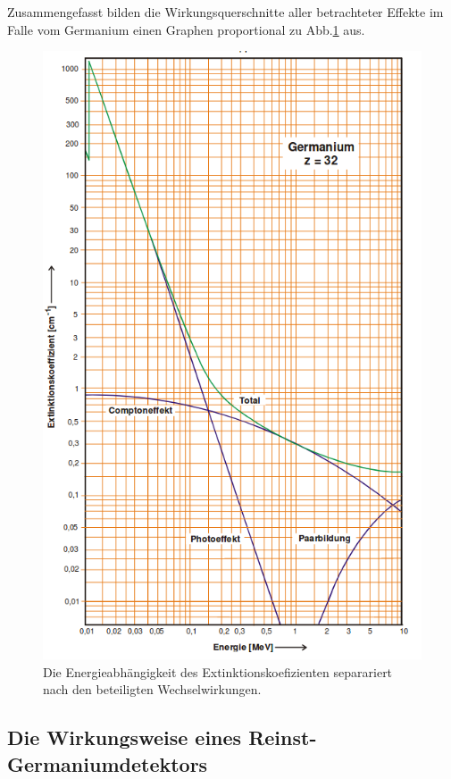 Zusammengefasst bilden die Wirkungsquerschnitte aller betrachteter Effekte im Falle vom Germanium einen Graphen proportional zu Abb.\ref{fig:effekt} aus. %

\begin{figure}
	\centering
	\includegraphics[width=\linewidth-100pt,height=\textheight-100pt,keepaspectratio]{content/Images/effekt.png}
    \caption{Die Energieabhängigkeit des Extinktionskoefizienten separariert nach den beteiligten Wechselwirkungen\cite{V18}.}
    \label{fig:effekt}
\end{figure}

\subsection{Die Wirkungsweise eines Reinst-Germaniumdetektors}

